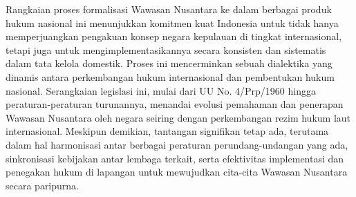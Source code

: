 \documentclass[12pt, a4paper]{article}
\begin{document}
Rangkaian proses formalisasi Wawasan Nusantara ke dalam berbagai produk hukum nasional ini menunjukkan komitmen kuat Indonesia untuk tidak hanya memperjuangkan pengakuan konsep negara kepulauan di tingkat internasional, tetapi juga untuk mengimplementasikannya secara konsisten dan sistematis dalam tata kelola domestik. Proses ini mencerminkan sebuah dialektika yang dinamis antara perkembangan hukum internasional dan pembentukan hukum nasional. Serangkaian legislasi ini, mulai dari UU No. 4/Prp/1960 hingga peraturan-peraturan turunannya, menandai evolusi pemahaman dan penerapan Wawasan Nusantara oleh negara seiring dengan perkembangan rezim hukum laut internasional. Meskipun demikian, tantangan signifikan tetap ada, terutama dalam hal harmonisasi antar berbagai peraturan perundang-undangan yang ada, sinkronisasi kebijakan antar lembaga terkait, serta efektivitas implementasi dan penegakan hukum di lapangan untuk mewujudkan cita-cita Wawasan Nusantara secara paripurna.
\end{document}
